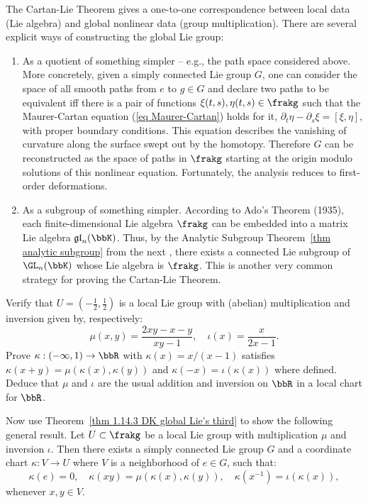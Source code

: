 \begin{rem}\label{rem Lie III}
    The Cartan-Lie Theorem gives a one-to-one correspondence between local data (Lie algebra) and global nonlinear data (group multiplication). There are several explicit ways of constructing the global Lie group:
    \begin{enumerate}
        \item As a quotient of something simpler -- e.g., the path space considered above. More concretely, given a simply connected Lie group $G$, one can consider the space of all smooth paths from $e$ to $g\in G$ and declare two paths to be equivalent iff there is a pair of functions $\xi(t,s),\eta(t,s)\in\frakg$ such that the Maurer-Cartan equation (\ref{eq Maurer-Cartan}) holds for it, $\partial_t\eta-\partial_s\xi=[\xi,\eta]$, with proper boundary conditions. This equation describes the vanishing of curvature along the surface swept out by the homotopy. Therefore $G$ can be reconstructed as the space of paths in $\frakg$ starting at the origin modulo solutions of this nonlinear equation. Fortunately, the analysis reduces to first-order deformations.

        \item As a subgroup of something simpler. According to Ado's Theorem (1935), each finite-dimensional Lie algebra $\frakg$ can be embedded into a matrix Lie algebra $\mathfrak{gl}_n(\bbK)$. Thus, by the Analytic Subgroup Theorem\ \ref{thm analytic subgroup} from the next \sect, there exists a connected Lie subgroup of $\GL_n(\bbK)$ whose Lie algebra is $\frakg$. This is another very common strategy for proving the Cartan-Lie Theorem.
    \end{enumerate}
\end{rem}


\begin{xca}
    Verify that $U=(-\frac12,\frac12)$ is a local Lie group with (abelian) multiplication and inversion given by, respectively:
    \[\mu(x,y)=\frac{2xy-x-y}{xy-1},\quad \iota(x)=\frac{x}{2x-1}.\]
    Prove $\kappa:(-\infty,1)\to \bbR$ with $\kappa(x)=x/(x-1)$ satisfies $\kappa(x+y)=\mu(\kappa(x),\kappa(y))$ and $\kappa(-x)=\iota(\kappa(x))$ where defined. Deduce that $\mu$ and $\iota$ are the usual addition and inversion on $\bbR$ in a local chart for $\bbR$. 

    Now use Theorem~\ref{thm 1.14.3 DK global Lie's third} to show the following general result. Let $U\subset \frakg$ be a local Lie group with multiplication $\mu$ and inversion $\iota$. Then there exists a simply connected Lie group $G$ and a coordinate chart $\kappa:V\to U$ where $V$ is a neighborhood of $e\in G$, such that:
    \[\kappa(e)=0,\quad \kappa(xy)=\mu(\kappa(x),\kappa(y)),\quad\kappa(x^{-1})=\iota(\kappa(x)),\]
    whenever $x,y\in V$.
\end{xca}






